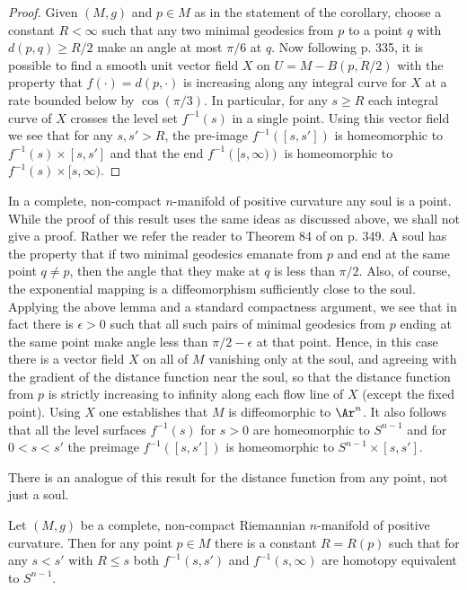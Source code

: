 \begin{proof}
Given $(M,g)$ and $p\in M$ as in the statement of the corollary, choose a
constant $R<\infty$ such that any two minimal geodesics from $p$ to a point $q$
with $d(p,q)\ge R/2$ make an angle at most $\pi/6$ at $q$. Now following
\cite{Petersen} p. 335, it is possible to find a smooth unit vector field $X$
on $U=M-\overline{B(p,R/2)}$ with the property that $f(\cdot)=d(p,\cdot)$ is
increasing along any integral curve for $X$ at a rate bounded below by
$\cos(\pi/3)$. In particular, for any $s\ge R$ each integral curve of $X$
crosses the level set $f^{-1}(s)$ in a single point. Using this vector field
we see that for any $s,s'>R$, the pre-image $f^{-1}([s,s'])$ is homeomorphic to
$f^{-1}(s)\times[s,s']$ and that the end $f^{-1}\left([s,\infty)\right)$ is
homeomorphic to $f^{-1}(s)\times [s,\infty)$.
\end{proof}


In a complete, non-compact $n$-manifold of positive curvature any soul is a
point. While the proof of this result uses the same ideas as discussed above,
we shall not give a proof. Rather we refer the reader to Theorem 84 of
\cite{Petersen} on p. 349. A soul has the property that if two minimal
geodesics emanate from $p$ and end at the same point $q\not= p$, then the angle
that they make at $q$ is less than $\pi/2$. Also, of course, the exponential
mapping is a diffeomorphism sufficiently close to the soul. Applying the above
lemma and a standard compactness argument, we see that in fact there is
$\epsilon>0$ such that all such pairs of minimal geodesics from $p$ ending at
the same point make angle less than $\pi/2-\epsilon$ at that point. Hence, in
this case there is a vector field $X$ on all of $M$ vanishing only at the soul,
and agreeing with the gradient of the distance function near the soul, so that
the distance function from $p$ is strictly increasing to infinity along each
flow line of $X$ (except the fixed point). Using $X$ one establishes that $M$
is diffeomorphic to $\Ar^n$. It also follows that all the level surfaces
$f^{-1}(s)$ for $s>0$ are homeomorphic to $S^{n-1}$ and for $0<s<s'$ the
preimage $f^{-1}([s,s'])$ is homeomorphic to $S^{n-1}\times[s,s']$.

There is an analogue of this result for the distance function from
any point, not just a soul.

\begin{corollary}
\label{cor:distance-annuli-homotopy-sphere}
\label{htpytype}
Let $(M,g)$ be a complete, non-compact Riemannian $n$-manifold of positive
curvature. Then for any point $p\in M$ there is a constant $R=R(p)$ such that
for any $s<s'$ with $R\le s$ both $f^{-1}(s,s')$ and $f^{-1}(s,\infty)$ are
homotopy equivalent to $S^{n-1}$.
\end{corollary}


